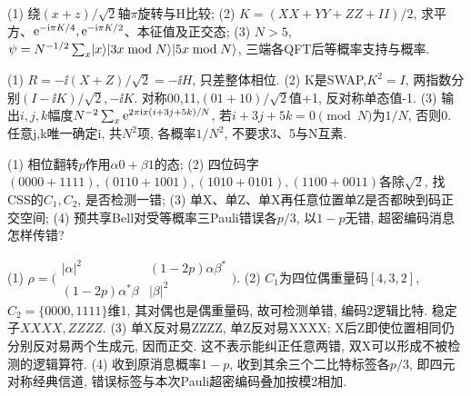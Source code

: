 \begin{exercise}(1) 绕$(x+z)/\sqrt2$轴$\pi$旋转与H比较; (2) $K=(XX+YY+ZZ+II)/2$, 求平方、$\mathrm e^{-\mathrm i\pi K/4},\mathrm e^{-\mathrm i\pi K/2}$、本征值及正交态; (3) $N>5$, $\psi=N^{-1/2}\sum_x\lvert x\rangle\lvert 3x\bmod N\rangle\lvert 5x\bmod N\rangle$, 三端各QFT后等概率支持与概率.\end{exercise}
\begin{solution}(1) $R=-\ii(X+Z)/\sqrt2=-\ii H$, 只差整体相位. (2) K是SWAP,$K^2=I$, 两指数分别$(I-\ii K)/\sqrt2,-\ii K$. 对称00,11,$(01+10)/\sqrt2$值+1, 反对称单态值-1. (3) 输出$i,j,k$幅度$N^{-2}\sum_x\mathrm e^{2\pi\mathrm i x(i+3j+5k)/N}$, 若$i+3j+5k=0\pmod N$为$1/N$, 否则0. 任意j,k唯一确定i, 共$N^2$项, 各概率$1/N^2$, 不要求3、5与N互素.
\end{solution}
\begin{exercise}(1) 相位翻转$p$作用$\alpha0+\beta1$的态; (2) 四位码字$(0000+1111),(0110+1001),(1010+0101),(1100+0011)$各除$\sqrt2$, 找CSS的$C_1,C_2$, 是否检测一错; (3) 单X、单Z、单X再任意位置单Z是否都映到码正交空间; (4) 预共享Bell对受等概率三Pauli错误各$p/3$, 以$1-p$无错, 超密编码消息怎样传错?\end{exercise}
\begin{solution}(1) $\rho=\bigl(\begin{smallmatrix}|\alpha|^2&(1-2p)\alpha\beta^*\\(1-2p)\alpha^*\beta&|\beta|^2\end{smallmatrix}\bigr)$. (2) $C_1$为四位偶重量码$[4,3,2]$,$C_2=\{0000,1111\}$维1, 其对偶也是偶重量码, 故可检测单错, 编码2逻辑比特. 稳定子$XXXX,ZZZZ$. (3) 单X反对易ZZZZ, 单Z反对易XXXX; X后Z即使位置相同仍分别反对易两个生成元, 因而正交. 这不表示能纠正任意两错, 双X可以形成不被检测的逻辑算符. (4) 收到原消息概率$1-p$, 收到其余三个二比特标签各$p/3$, 即四元对称经典信道, 错误标签与本次Pauli超密编码叠加按模2相加.
\end{solution}
